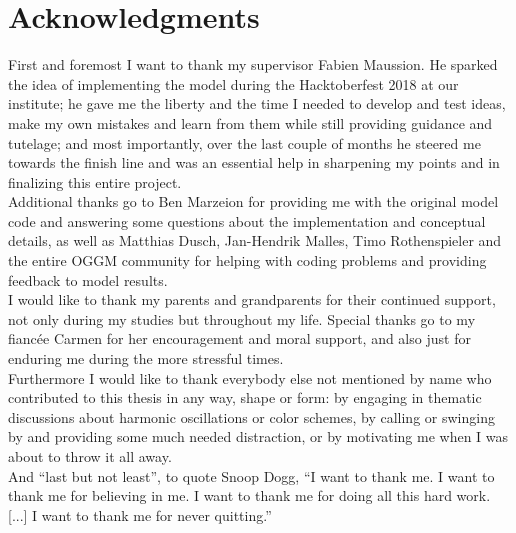 \chapter*{Acknowledgments}
\thispagestyle{plain}
\noindent First and foremost I want to thank my supervisor Fabien Maussion. He sparked the idea of implementing the \vas{} model during the Hacktoberfest 2018 at our institute; he gave me the liberty and the time I needed to develop and test ideas, make my own mistakes and learn from them while still providing guidance and tutelage; and most importantly, over the last couple of months he steered me towards the finish line and was an essential help in sharpening my points and in finalizing this entire project.\\[0.3cm]
\noindent Additional thanks go to Ben Marzeion for providing me with the original model code and answering some questions about the implementation and conceptual details, as well as Matthias Dusch, Jan-Hendrik Malles, Timo Rothenspieler and the entire OGGM community for helping with coding problems and providing feedback to model results.\\[0.3cm]
\noindent I would like to thank my parents and grandparents for their continued support, not only during my studies but throughout my life. Special thanks go to my fiancée Carmen for her encouragement and moral support, and also just for enduring me during the more stressful times.\\[0.3cm]
\noindent Furthermore I would like to thank everybody else not mentioned by name who contributed to this thesis in any way, shape or form: by engaging in thematic discussions about harmonic oscillations or color schemes, by calling or swinging by and providing some much needed distraction, or by motivating me when I was about to throw it all away.\\[0.3cm]
\noindent And ``last but not least'', to quote Snoop Dogg, ``I want to thank me. I want to thank me for believing in me. I want to thank me for doing all this hard work. [...] I want to thank me for never quitting.''